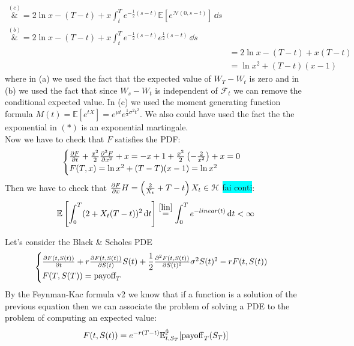 \begin{example}{}{}{}
\begin{align*}
        \overset{(c)}&{=} 
        2\ln x - (T-t) + x\int^T_t e^{-\frac{1}{2}(s-t)} \mathbb{E}\left[e^{\mathcal{N}(0,s-t)}\right] \,\dd s \\
        \overset{(b)}&{=} 
        2\ln x - (T-t) + x\int^T_t e^{-\frac{1}{2}(s-t)}e^{\frac{1}{2}(s-t)} \,\dd s \\
        &=
        2\ln x - (T-t) + x(T-t) \\
        &= 
        \ln x^2 + (T-t)(x-1)
    \end{align*}
    where in (a) we used the fact that the expected value of $W_T-W_t$ is zero and in (b) we used the fact that since $W_s-W_t$ is independent of $\mathcal{F}_t$ we can remove the conditional expected value. In (c) we used the moment generating function formula ${M(t)=\mathbb{E}[e^{tX}]=e^{\mu t}e^{{\frac {1}{2}}\sigma^{2}t^{2}}}$. We also could have used the fact the the exponential in $(*)$ is an exponential martingale.\\
    Now we have to check that $F$ satisfies the PDF:
    \begin{equation*}
        \begin{cases}
        \pdv{F}{t}(t,x) + \frac{x^2}{2}\pdv[2]{F}{x}(t,x) + x = -x+1+\frac{x^2}{2}\left(-\frac{2}{x^2}\right)+x = 0\\
        F(T,x) = \ln x^2 + (T-T)(x-1) = \ln x^2
        \end{cases}
    \end{equation*}
    Then we have to check that $\pdv{F}{x}H = \left(\frac{2}{X_t}+T-t\right)X_t\in\mathcal{H}$ \colorbox{cyan}{fai conti}:
    \begin{equation*}
        \mathbb{E}\left[\int^T_0 (2 + X_t(T-t))^2\,\dd t\right] \overset{\eqref{lin}}{=} \int^T_0 e^{-linear(t)}\,\dd t < \infty
    \end{equation*}
\end{example}
Let's consider the Black \& Scholes PDE
\begin{equation}
    \begin{cases}
    \pdv{F(t,S(t))}{t} + r\pdv{F(t,S(t))}{S(t)} S(t) + \dfrac{1}{2}\pdv[2]{F(t,S(t))}{S(t)}\sigma^2S(t)^2 - rF(t,S(t))\\
    F(T,S(T)) = \mbox{payoff}_T
    \end{cases}
\end{equation}
By the Feynman-Kac formula v2 we know that if a function is a solution of the previous equation then we can associate the problem of solving a PDE to the problem of computing an expected value:
\begin{equation}
    F(t,S(t)) = e^{-r(T-t)}\mathbb{E}^{\hat{\mathbb{P}}}_{t,S_T}[\operatorname{payoff}_T(S_T)]
\end{equation}
